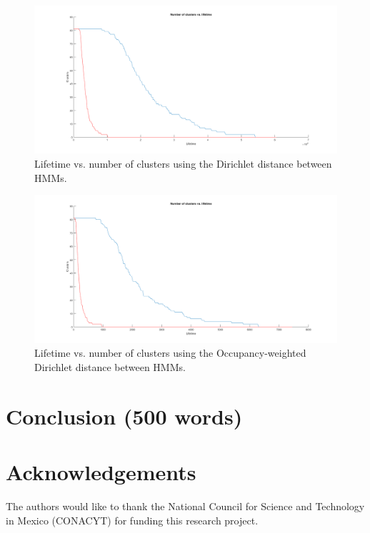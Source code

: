 \documentclass[pdftex,11pt,a4paper]{article}
\theoremstyle{definition}
\theoremstyle{remark}
\begin{document}
\begin{figure}[H]
\centering
\includegraphics[width=\textwidth]{images/lifetime_dirichlet_unweighted}
\caption{Lifetime vs. number of clusters using the Dirichlet distance between HMMs.}
\label{fig_lt_du}
\end{figure}

\begin{figure}[H]
\centering
\includegraphics[width=\textwidth]{images/lifetimedirichlet_occupancy}
\caption{Lifetime vs. number of clusters using the Occupancy-weighted Dirichlet distance between HMMs.}
\label{fig_lt_occ}
\end{figure}   


\section{Conclusion (500 words)}
\label{section_conclusion}



\section*{Acknowledgements}


The authors would like to thank the National Council for Science and Technology in Mexico (CONACYT) for funding this research project.




\end{document}
